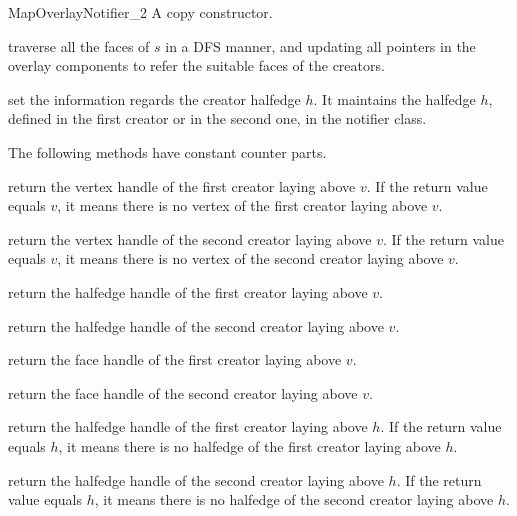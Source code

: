 \begin{ccRefConcept}{MapOverlayNotifier_2}
{A copy constructor.}

\ccOperations
{}
{traverse all the faces of $s$ in a DFS manner, and updating all pointers 
in the overlay components to refer the suitable faces of the creators.}

{set the information regards the creator halfedge $h$.
   It maintains the halfedge $h$, defined in the first creator or in the
   second one, in the notifier class.}


The following methods have constant counter parts.

{return the vertex handle of the first creator laying above $v$.
 If the return value equals $v$, it means there is no vertex of the first creator laying 
above $v$.}
  
{return the vertex handle of the second creator laying above $v$.
   If the return value equals $v$, it means there is no vertex of the second creator laying 
   above $v$.}
  
{return the halfedge handle of the first creator laying above $v$.}

{return the halfedge handle of the second creator laying above $v$.}

{return the face handle of the first creator laying above $v$.}

{return the face handle of the second creator laying above $v$.}

{return the halfedge handle of the first creator laying above $h$.
   If the return value equals $h$, it means there is no halfedge of the first creator laying 
   above $h$.}

{return the halfedge handle of the second creator laying above $h$.
   If the return value equals $h$, it means there is no halfedge of the second creator laying 
   above $h$.}


\end{ccRefConcept}
